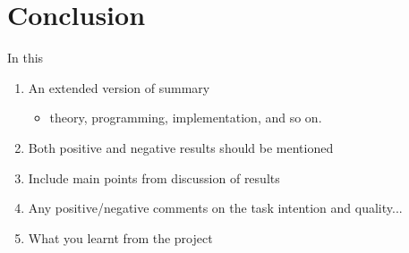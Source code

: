 \section{Conclusion}\label{sec:conclusion}

In this 

\begin{enumerate}[i]
    \item An extended version of summary
    \begin{itemize}
        \item theory, programming, implementation, and so on.
    \end{itemize}
    \item Both positive and negative results should be mentioned
    \item Include main points from discussion of results
    \item Any positive/negative comments on the task intention and quality...
    \item What you learnt from the project
\end{enumerate}
